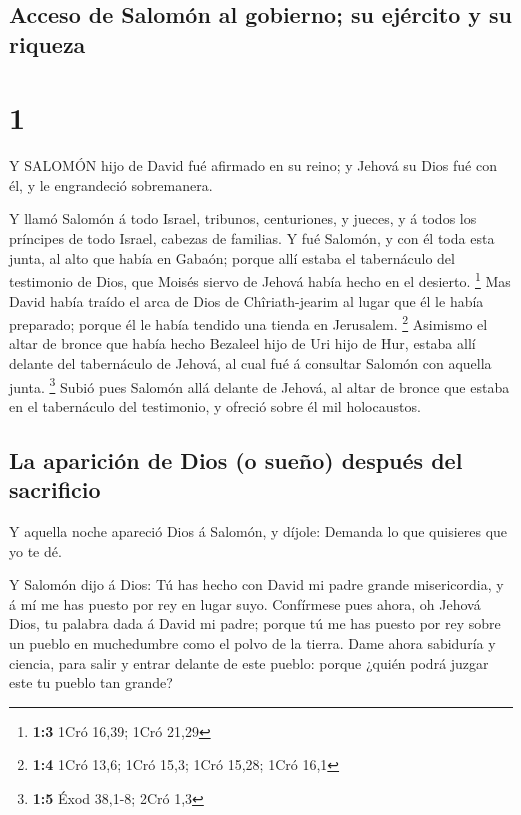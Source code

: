 \hypertarget{acceso-de-salomuxf3n-al-gobierno-su-ejuxe9rcito-y-su-riqueza}{%
\subsection{Acceso de Salomón al gobierno; su ejército y su
riqueza}\label{acceso-de-salomuxf3n-al-gobierno-su-ejuxe9rcito-y-su-riqueza}}

\hypertarget{section}{%
\section{1}\label{section}}

 Y SALOMÓN hijo de David fué afirmado en su reino; y Jehová
su Dios fué con él, y le engrandeció sobremanera.

 Y llamó Salomón á todo Israel, tribunos, centuriones, y
jueces, y á todos los príncipes de todo Israel, cabezas de familias.
 Y fué Salomón, y con él toda esta junta, al alto que había
en Gabaón; porque allí estaba el tabernáculo del testimonio de Dios, que
Moisés siervo de Jehová había hecho en el desierto. \footnote{\textbf{1:3}
  1Cró 16,39; 1Cró 21,29}  Mas David había traído el arca de
Dios de Chîriath-jearim al lugar que él le había preparado; porque él le
había tendido una tienda en Jerusalem. \footnote{\textbf{1:4} 1Cró 13,6;
  1Cró 15,3; 1Cró 15,28; 1Cró 16,1}  Asimismo el altar de
bronce que había hecho Bezaleel hijo de Uri hijo de Hur, estaba allí
delante del tabernáculo de Jehová, al cual fué á consultar Salomón con
aquella junta. \footnote{\textbf{1:5} Éxod 38,1-8; 2Cró 1,3}
 Subió pues Salomón allá delante de Jehová, al altar de
bronce que estaba en el tabernáculo del testimonio, y ofreció sobre él
mil holocaustos.

\hypertarget{la-apariciuxf3n-de-dios-o-sueuxf1o-despuuxe9s-del-sacrificio}{%
\subsection{La aparición de Dios (o sueño) después del
sacrificio}\label{la-apariciuxf3n-de-dios-o-sueuxf1o-despuuxe9s-del-sacrificio}}

 Y aquella noche apareció Dios á Salomón, y díjole: Demanda
lo que quisieres que yo te dé.

 Y Salomón dijo á Dios: Tú has hecho con David mi padre
grande misericordia, y á mí me has puesto por rey en lugar suyo.
 Confírmese pues ahora, oh Jehová Dios, tu palabra dada á
David mi padre; porque tú me has puesto por rey sobre un pueblo en
muchedumbre como el polvo de la tierra.  Dame ahora
sabiduría y ciencia, para salir y entrar delante de este pueblo: porque
¿quién podrá juzgar este tu pueblo tan grande?

